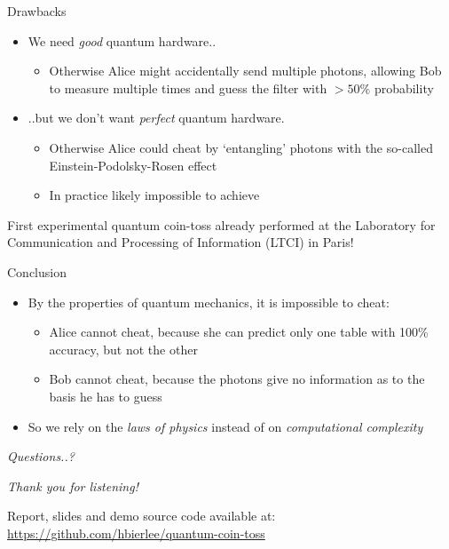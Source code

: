 \documentclass{beamer}
\begin{document}
\begin{frame}{Drawbacks}
\begin{itemize}
    \item We need \emph{good} quantum hardware..
        \begin{itemize}
            \item Otherwise Alice might accidentally send multiple photons, allowing Bob to measure multiple times and guess the filter with $>50\%$ probability
        \end{itemize}
    \item ..but we don't want \emph{perfect} quantum hardware.
        \begin{itemize}
            \item Otherwise Alice could cheat by `entangling' photons with the so-called Einstein-Podolsky-Rosen effect
            \item In practice likely impossible to achieve
        \end{itemize}
\end{itemize}
First experimental quantum coin-toss already performed at the Laboratory for Communication and Processing of Information (LTCI) in Paris!
\end{frame}


\begin{frame}{Conclusion}
\begin{itemize}
    \item By the properties of quantum mechanics, it is impossible to cheat:
    \begin{itemize}
        \item Alice cannot cheat, because she can predict only one table with 100\% accuracy, but not the other
        \item Bob cannot cheat, because the photons give no information as to the basis he has to guess
    \end{itemize}
    \vfill
    \item So we rely on the \emph{laws of physics} instead of on \emph{computational complexity}
    \vfill
\end{itemize}
\end{frame}

\begin{frame}[plain,c]

\begin{center}
    \Huge \emph{Questions..?}
\end{center}

\end{frame}


\begin{frame}[plain,c]

\begin{center}
    \Huge \emph{Thank you for listening!}

\end{center}
\vfill
    \large
    Report, slides and demo source code available at:\\ \quad \url{https://github.com/hbierlee/quantum-coin-toss}

\end{frame}
\end{document}
